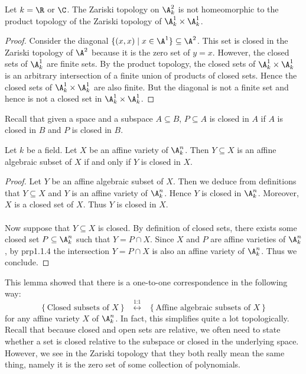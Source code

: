\documentclass[a4paper]{article}
\begin{document}
\begin{eg}{}{} Let $k=\R$ or $\C$. The Zariski topology on $\A_k^2$ is not homeomorphic to the product topology of the Zariski topology of $\A_k^1\times\A_k^1$. 
\begin{proof}
Consider the diagonal $\{(x,x)\;|\;x\in\A^1\}\subseteq\A^2$. This set is closed in the Zariski topology of $\A^2$ because it is the zero set of $y=x$. However, the closed sets of $\A_k^1$ are finite sets. By the product topology, the closed sets of $\A_k^1\times\A_k^1$ is an arbitrary intersection of a finite union of products of closed sets. Hence the closed sets of $\A_k^1\times\A_k^1$ are also finite. But the diagonal is not a finite set and hence is not a closed set in $\A_k^1\times\A_k^1$. 
\end{proof}
\end{eg}

Recall that given a space and a subspace $A\subseteq B$, $P\subseteq A$ is closed in $A$ if $A$ is closed in $B$ and $P$ is closed in $B$. 

\begin{lmm}{}{} Let $k$ be a field. Let $X$ be an affine variety of $\A_k^n$. Then $Y\subseteq X$ is an affine algebraic subset of $X$ if and only if $Y$ is closed in $X$. 
\begin{proof}
Let $Y$ be an affine algebraic subset of $X$. Then we deduce from definitions that $Y\subseteq X$ and $Y$ is an affine variety of $\A_k^n$. Hence $Y$ is closed in $\A_k^n$. Moreover, $X$ is a closed set of $X$. Thus $Y$ is closed in $X$. \\~\\

Now suppose that $Y\subseteq X$ is closed. By definition of closed sets, there exists some closed set $P\subseteq\A_k^n$ such that $Y=P\cap X$. Since $X$ and $P$ are affine varieties of $\A_k^n$, by prp1.1.4 the intersection $Y=P\cap X$ is also an affine variety of $\A_k^n$. Thus we conclude. 
\end{proof}
\end{lmm}

This lemma showed that there is a one-to-one correspondence in the following way: $$\left\{\text{Closed subsets of }X\right\}\;\;\overset{\text{1:1}}{\longleftrightarrow}\;\;\left\{\text{Affine algebraic subsets of }X\right\}$$ for any affine variety $X$ of $\A_k^n$. In fact, this simplifies quite a lot topologically. Recall that because closed and open sets are relative, we often need to state whether a set is closed relative to the subspace or closed in the underlying space. However, we see in the Zariski topology that they both really mean the same thing, namely it is the zero set of some collection of polynomials. 
\end{document}
